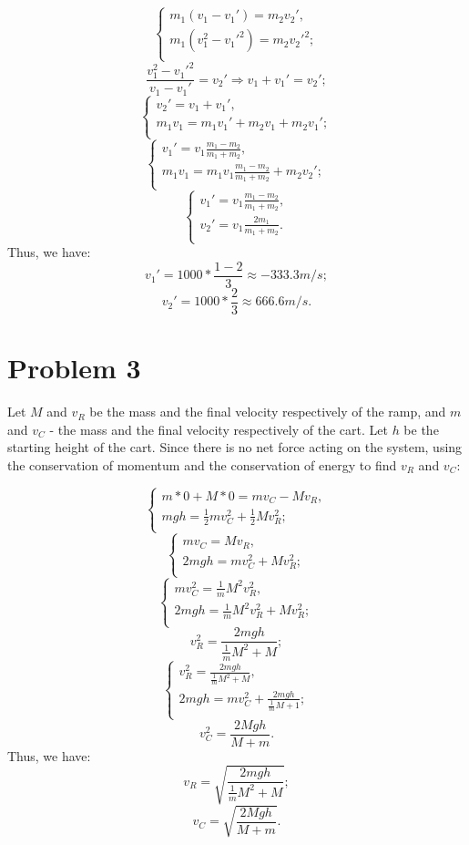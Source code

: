 \documentclass{article}
\begin{document}
\[
\begin{cases}
m_1(v_1 - v_1\prime) = m_2v_2\prime,\\
m_1(v_1^2 - v_1\prime^2) = m_2v_2\prime^2;\\
\end{cases}
\]
\[
\frac{v_1^2 - v_1\prime^2}{v_1 - v_1\prime} = v_2\prime \Rightarrow v_1 + v_1\prime = v_2\prime;
\]
\[
\begin{cases}
v_2\prime = v_1 + v_1\prime,\\
m_1v_1 = m_1v_1\prime + m_2v_1 + m_2v_1\prime;\\
\end{cases}
\]
\[
\begin{cases}
v_1\prime = v_1\frac{m_1 - m_2}{m_1 + m_2},\\
m_1v_1 = m_1v_1\frac{m_1 - m_2}{m_1 + m_2} + m_2v_2\prime;\\
\end{cases}
\]
\[
\begin{cases}
v_1\prime = v_1\frac{m_1 - m_2}{m_1 + m_2},\\
v_2\prime = v_1\frac{2m_1}{m_1 + m_2}.\\
\end{cases}
\]
Thus, we have:
\[
v_1\prime = 1000 * \frac{1 - 2}{3} \approx -333.3m/s;
\]
\[
v_2\prime = 1000 * \frac{2}{3} \approx 666.6m/s.
\]

\section*{Problem 3}
Let $M$ and $v_R$ be the mass and the final velocity respectively of the ramp, and $m$ and $v_C$ - the mass and the final velocity respectively of the cart. Let $h$ be the starting height of the cart. Since there is no net force acting on the system, using the conservation of momentum and the conservation of energy to find $v_R$ and $v_C$:

\[
\begin{cases}
m * 0 + M * 0 = mv_C - Mv_R,\\
mgh = \frac{1}{2}mv_C^2 + \frac{1}{2}Mv_R^2;\\
\end{cases}
\]
\[
\begin{cases}
mv_C = Mv_R,\\
2mgh = mv_C^2 + Mv_R^2;\\
\end{cases}
\]
\[
\begin{cases}
mv_C^2 = \frac{1}{m}M^2v_R^2,\\
2mgh = \frac{1}{m}M^2v_R^2 + Mv_R^2;\\
\end{cases}
\]
\[
v_R^2 = \frac{2mgh}{\frac{1}{m}M^2 + M};
\]
\[
\begin{cases}
v_R^2 = \frac{2mgh}{\frac{1}{m}M^2 + M},\\
2mgh = mv_C^2 + \frac{2mgh}{\frac{1}{m}M + 1};\\
\end{cases}
\]
\[
v_C^2 = \frac{2Mgh}{M + m}.
\]
Thus, we have:
\[
v_R = \sqrt{\frac{2mgh}{\frac{1}{m}M^2 + M}};
\]
\[
v_C = \sqrt{\frac{2Mgh}{M + m}}.
\]
\end{document}
